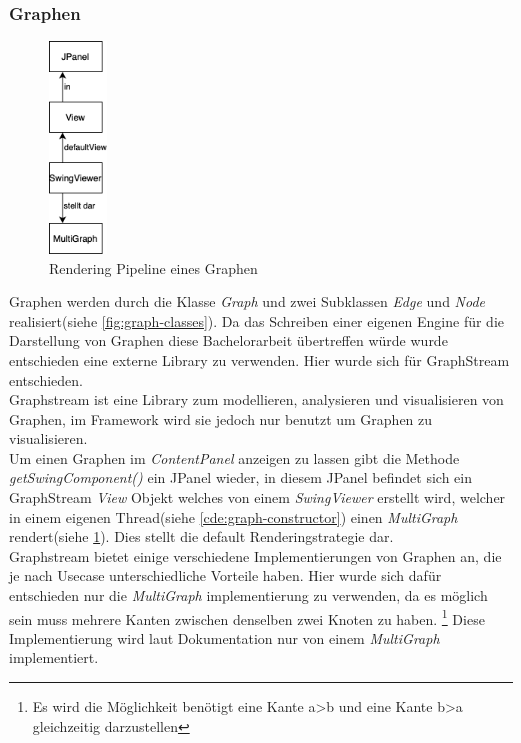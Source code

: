 \subsubsection{Graphen}
\begin{figure}
  \vspace{-10pt}
  \centering
  \includegraphics[width=0.1375\textwidth]{fig/GUI_Graph_rendering_pipeline.png}
  \caption{Rendering Pipeline eines Graphen}%
  \label{fig:graph-rendering-pipeline}
  \vspace{-10pt}
\end{figure}
Graphen werden durch die Klasse \textit{Graph} und zwei Subklassen 
\textit{Edge} und \textit{Node} realisiert(siehe \cref{fig:graph-classes}).
Da das Schreiben einer eigenen Engine für die Darstellung von Graphen
diese Bachelorarbeit übertreffen würde wurde entschieden eine externe Library
zu verwenden. Hier wurde sich für GraphStream\cite{GS}
entschieden.\\

Graphstream ist eine Library zum modellieren, analysieren und visualisieren von Graphen,
im Framework wird sie jedoch nur benutzt um Graphen zu visualisieren.\\
Um einen Graphen im \textit{ContentPanel} anzeigen zu lassen gibt 
die Methode \textit{getSwingComponent()} ein JPanel wieder,
in diesem JPanel befindet sich ein GraphStream \textit{View} Objekt welches von einem
\textit{SwingViewer} erstellt wird, welcher in einem eigenen Thread(siehe \cref{cde:graph-constructor}) einen
\textit{MultiGraph} rendert(siehe \cref{fig:graph-rendering-pipeline}).
Dies stellt die default Renderingstrategie dar\cite{GS_render}.\\
Graphstream bietet einige verschiedene Implementierungen von Graphen an, 
die je nach Usecase unterschiedliche Vorteile haben. Hier wurde sich dafür
entschieden nur die \textit{MultiGraph} implementierung zu verwenden, da es
möglich sein muss mehrere Kanten zwischen denselben zwei Knoten zu haben.
\footnote{Es wird die Möglichkeit benötigt eine Kante a>b und eine Kante b>a gleichzeitig darzustellen}
Diese Implementierung wird laut Dokumentation nur von einem \textit{MultiGraph}
implementiert.\cite{GS_graphs}\\

